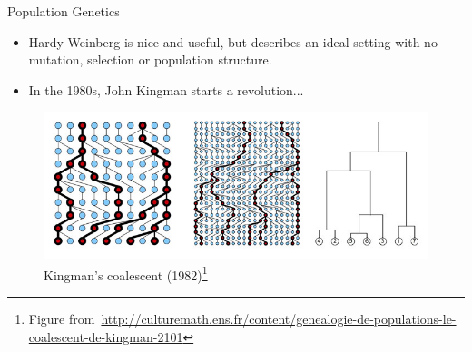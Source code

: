 \begin{frame}{Population Genetics}
 \begin{itemize}[label={$\bullet$}]
 \item Hardy-Weinberg is nice and useful, but describes an ideal setting with no mutation, selection or population structure.
 \item In the 1980s, John Kingman starts a revolution...
\end{itemize}
\begin{figure}
 \includegraphics[scale=0.45]{FIGURES/kingman.jpg}
 \caption{Kingman's coalescent (1982)\footnote{\tiny Figure from~\url{http://culturemath.ens.fr/content/genealogie-de-populations-le-coalescent-de-kingman-2101}}}
\end{figure}
\end{frame}
